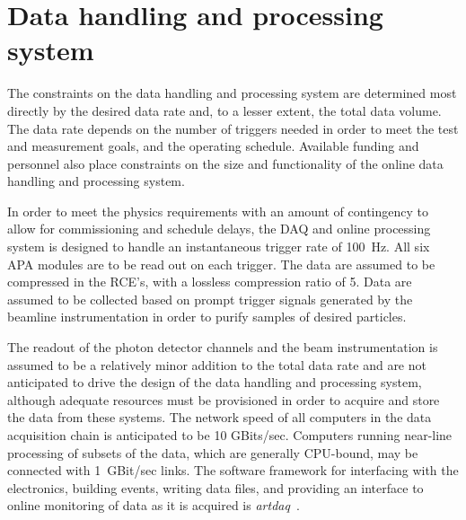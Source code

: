 
\section{Data handling and processing system}

The constraints on the data handling and processing system are
determined most directly by the desired data rate and, to a lesser
extent, the total data volume.  The data rate depends on the number of
triggers needed in order to meet the test and measurement goals, and
the operating schedule.  Available funding and personnel also place
constraints on the size and functionality of the online data handling
and processing system.

In order to meet the physics requirements with an amount of
contingency to allow for commissioning and schedule delays, the DAQ
and online processing system is designed to handle an instantaneous
trigger rate of 100~Hz.  All six APA modules are to be read out on
each trigger.  The data are assumed to be compressed in the RCE's,
with a lossless compression ratio of 5.  Data are assumed to be
collected based on prompt trigger signals generated by the beamline
instrumentation in order to purify samples of desired particles.

The readout of the photon detector channels and the beam
instrumentation is assumed to be a relatively minor addition to the
total data rate and are not anticipated to drive the design of the
data handling and processing system, although adequate resources must
be provisioned in order to acquire and store the data from these
systems.  The network speed of all computers in the data acquisition
chain is anticipated to be 10 GBits/sec.  Computers running near-line
processing of subsets of the data, which are generally CPU-bound, may
be connected with 1~GBit/sec links.  The software framework for
interfacing with the electronics, building events, writing data files,
and providing an interface to online monitoring of data as it is
acquired is {\it artdaq}~\cite{artdaq}.

